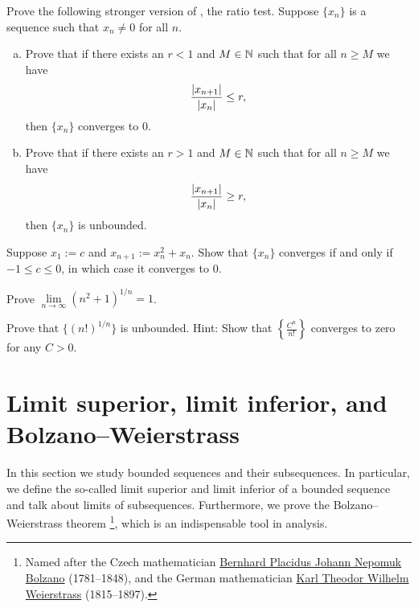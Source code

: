 \begin{samepage}
\begin{exercise}[Easy] \label{exercise:strongerratiotest1}
Prove the following stronger version of , the ratio
test.  
Suppose $\{ x_n \}$ is a sequence such that $x_n \not= 0$ for all
$n$.
\begin{enumerate}[a)]
\item
Prove that if there exists an $r < 1$ and $M \in {\mathbb{N}}$ such that
for all $n \geq M$ we have
\begin{equation*}
\frac{\left\lvert {x_{n+1}} \right\rvert}{\left\lvert {x_n} \right\rvert} \leq r ,
\end{equation*}
then $\{ x_n \}$ converges to $0$.
\item
Prove that if there exists an $r > 1$ and $M \in {\mathbb{N}}$ such that
for all $n \geq M$ we have
\begin{equation*}
\frac{\left\lvert {x_{n+1}} \right\rvert}{\left\lvert {x_n} \right\rvert} \geq r ,
\end{equation*}
then $\{ x_n \}$ is unbounded.
\end{enumerate}
\end{exercise}
\end{samepage}

\begin{exercise} \label{exercise:convergentinitialvalues}
Suppose $x_1 := c$ and $x_{n+1} := x_n^2+x_n$.
Show that $\{ x_n \}$ converges if and only if $-1 \leq c \leq 0$, in which
case it converges to 0.
\end{exercise}

\begin{exercise}
Prove $\lim\limits_{n \to \infty} {(n^2+1)}^{1/n} = 1$.
\end{exercise}

\begin{exercise}
Prove that $\bigl\{ {(n!)}^{1/n} \bigr\}$
is unbounded.
Hint: Show that $\left\{ \frac{C^n}{n!} \right\}$ converges to zero
for any $C > 0$.
\end{exercise}


\sectionnewpage
\section{Limit superior, limit inferior, and Bolzano--Weierstrass}
\label{sec:bw}


In this section we study bounded sequences and their subsequences.
In particular, we define the so-called limit superior and limit inferior
of a bounded sequence and talk about limits of subsequences.
Furthermore, we prove the
Bolzano--Weierstrass theorem%
\footnote{%
Named after the Czech mathematician
\href{https://en.wikipedia.org/wiki/Bernard_Bolzano}{Bernhard Placidus Johann Nepomuk Bolzano}
(1781--1848), and the German mathematician
\href{https://en.wikipedia.org/wiki/Karl_Weierstrass}{Karl Theodor Wilhelm Weierstrass}
(1815--1897).}, which is an
indispensable tool in analysis.

